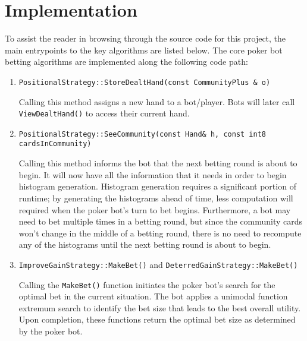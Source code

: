\section{Implementation}
\label{sec:CompleteImplementation}
To assist the reader in browsing through the source code for this project, the main entrypoints to the key algorithms are listed below.
The core poker bot betting algorithms are implemented along the following code path:
\begin{enumerate}
\singlespacing
\item \texttt{PositionalStrategy::StoreDealtHand(const CommunityPlus \& o)}

Calling this method assigns a new hand to a bot/player.
Bots will later call \texttt{ViewDealtHand()} to access their current hand.

\item \texttt{PositionalStrategy::SeeCommunity(const Hand\& h, const int8 cardsInCommunity)}

Calling this method informs the bot that the next betting round is about to begin.
It will now have all the information that it needs in order to begin histogram generation.
Histogram generation requires a significant portion of runtime; by generating the histograms ahead of time, less computation will required when the poker bot's turn to bet begins.
Furthermore, a bot may need to bet multiple times in a betting round, but since the community cards won't change in the middle of a betting round, there is no need to recompute any of the histograms until the next betting round is about to begin.

\item \texttt{ImproveGainStrategy::MakeBet()} and \texttt{DeterredGainStrategy::MakeBet()}

Calling the \texttt{MakeBet()} function initiates the poker bot's search for the optimal bet in the current situation.
The bot applies a unimodal function extremum search to identify the bet size that leads to the best overall utility.
Upon completion, these functions return the optimal bet size as determined by the poker bot.
\end{enumerate}

